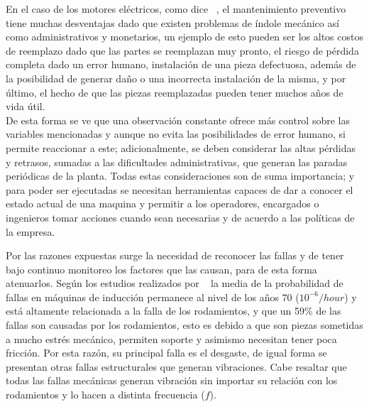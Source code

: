 	En el caso de los motores eléctricos, como dice ~\textcite{Lacey}, el mantenimiento preventivo tiene muchas desventajas dado que existen problemas de índole mecánico así como administrativos y monetarios, un ejemplo de esto pueden ser los altos costos de reemplazo dado que las partes se reemplazan muy pronto, el riesgo de pérdida completa dado un error humano, instalación de una pieza defectuosa, además de la posibilidad de generar daño o una incorrecta instalación de la misma, y por último, el hecho de que las piezas reemplazadas pueden tener muchos años de vida útil.\\
	
	
	De esta forma se ve que una observación constante ofrece más control sobre las variables mencionadas y aunque no evita las posibilidades de error humano, si permite reaccionar a este; adicionalmente, se deben considerar las altas pérdidas y retrasos, sumadas a las dificultades administrativas, que generan las paradas periódicas de la planta. Todas estas consideraciones son de suma importancia; y para poder ser ejecutadas se necesitan herramientas capaces de dar a conocer el estado actual de una maquina y permitir a los operadores, encargados o ingenieros tomar acciones cuando sean necesarias y de acuerdo a las políticas de la empresa. 


	Por las razones expuestas surge la necesidad de reconocer las fallas y de tener bajo continuo monitoreo los factores que las causan, para de esta forma atenuarlos. Según los estudios realizados por ~\textcite{Kammermann} la media de la probabilidad de fallas en máquinas de inducción permanece al nivel de los años 70 ($10^{-6}/hour$) y está altamente relacionada a la falla de los rodamientos, y que un 59\% de las fallas son causadas por los rodamientos, esto es debido a que son piezas sometidas a mucho estrés mecánico, permiten soporte y asimismo necesitan tener poca fricción. Por esta razón, su principal falla es el desgaste, de igual forma se presentan otras fallas estructurales que generan vibraciones. Cabe resaltar que todas las fallas mecánicas generan vibración sin importar su relación con los rodamientos y lo hacen a distinta frecuencia ($f$). \\


